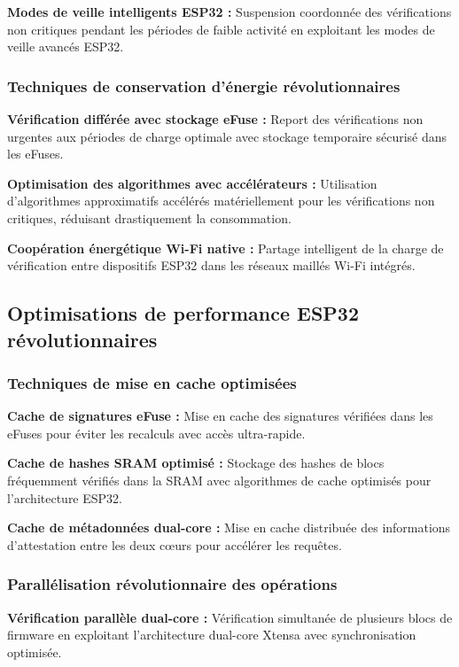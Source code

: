 \begin{algorithm}
\textbf{Modes de veille intelligents ESP32 :} Suspension coordonnée des vérifications non critiques pendant les périodes de faible activité en exploitant les modes de veille avancés ESP32.

\subsubsection{Techniques de conservation d'énergie révolutionnaires}

\textbf{Vérification différée avec stockage eFuse :} Report des vérifications non urgentes aux périodes de charge optimale avec stockage temporaire sécurisé dans les eFuses.

\textbf{Optimisation des algorithmes avec accélérateurs :} Utilisation d'algorithmes approximatifs accélérés matériellement pour les vérifications non critiques, réduisant drastiquement la consommation.

\textbf{Coopération énergétique Wi-Fi native :} Partage intelligent de la charge de vérification entre dispositifs ESP32 dans les réseaux maillés Wi-Fi intégrés.

\subsection{Optimisations de performance ESP32 révolutionnaires}

\subsubsection{Techniques de mise en cache optimisées}

\textbf{Cache de signatures eFuse :} Mise en cache des signatures vérifiées dans les eFuses pour éviter les recalculs avec accès ultra-rapide.

\textbf{Cache de hashes SRAM optimisé :} Stockage des hashes de blocs fréquemment vérifiés dans la SRAM avec algorithmes de cache optimisés pour l'architecture ESP32.

\textbf{Cache de métadonnées dual-core :} Mise en cache distribuée des informations d'attestation entre les deux cœurs pour accélérer les requêtes.

\subsubsection{Parallélisation révolutionnaire des opérations}

\textbf{Vérification parallèle dual-core :} Vérification simultanée de plusieurs blocs de firmware en exploitant l'architecture dual-core Xtensa avec synchronisation optimisée.


\end{algorithm}
